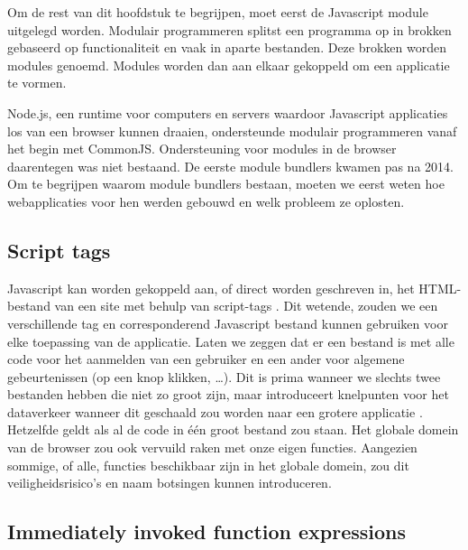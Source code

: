 Om de rest van dit hoofdstuk te begrijpen, moet eerst de \gls{Javascript} module uitgelegd worden. Modulair programmeren splitst een programma op in brokken gebaseerd op functionaliteit en vaak in aparte bestanden. Deze brokken worden modules genoemd. Modules worden dan aan elkaar gekoppeld om een applicatie te vormen. \autocite{webpack-no-dateB} \autocite{mozilla-2021A}

Node.js, een runtime voor computers en servers waardoor \gls{Javascript} applicaties los van een browser kunnen draaien, ondersteunde modulair programmeren vanaf het begin met CommonJS. Ondersteuning voor modules in de browser daarentegen was niet bestaand. De eerste module bundlers kwamen pas na 2014. Om te begrijpen waarom module bundlers bestaan, moeten we eerst weten hoe webapplicaties voor hen werden gebouwd en welk probleem ze oplosten. \autocite{webpack-no-dateA}

\subsection{Script tags}

\gls{Javascript} kan worden gekoppeld aan, of direct worden geschreven in, het \gls{HTML}-bestand van een site met behulp van script-tags \autocite{mozilla-2021}. Dit wetende, zouden we een verschillende tag en corresponderend \gls{Javascript} bestand kunnen gebruiken voor elke toepassing van de applicatie. Laten we zeggen dat er een bestand is met alle code voor het aanmelden van een gebruiker en een ander voor algemene gebeurtenissen (op een knop klikken, \ldots). Dit is prima wanneer we slechts twee bestanden hebben die niet zo groot zijn, maar introduceert knelpunten voor het dataverkeer wanneer dit geschaald zou worden naar een grotere applicatie \autocite{webpack-no-dateB}. Hetzelfde geldt als al de code in één groot bestand zou staan. Het globale domein van de browser zou ook vervuild raken met onze eigen functies. Aangezien sommige, of alle, functies beschikbaar zijn in het globale domein, zou dit veiligheidsrisico's en naam botsingen kunnen introduceren. 



\subsection{Immediately invoked function expressions}

